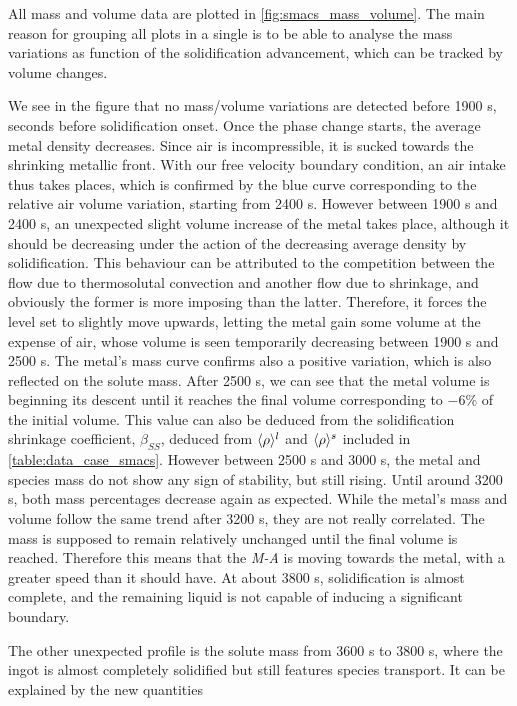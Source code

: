 All mass and volume data are plotted in \cref{fig:smacs_mass_volume}. The main reason for grouping all plots in a single
is to be able to analyse the mass variations as function of the solidification advancement, which can be tracked
by volume changes.

We see in the figure that no mass/volume variations are detected before 1900 s, seconds before solidification onset. Once the phase change starts, the average metal density decreases. Since air is incompressible, it is sucked towards the shrinking metallic front.
With our free velocity boundary condition, an air intake thus takes places, which is confirmed by the blue curve corresponding to the relative air volume variation, starting from 2400 s. However between 1900 s and 2400 s, an unexpected slight volume increase of the metal takes place, although it should be decreasing under the action of the decreasing average density by solidification. This behaviour can be attributed to the competition between the flow due to thermosolutal convection and another flow due to shrinkage, and obviously the former is more  imposing than the latter. Therefore, it forces the level set to slightly move upwards, letting the metal gain some volume at the expense of air, whose volume is seen temporarily decreasing between 1900 s and 2500 s.
The metal's mass curve confirms also a positive variation, which is also reflected on the solute mass.
After 2500 s, we can see that the metal volume is beginning its descent until it reaches the final volume corresponding to $-6\%$ of the initial volume. This value can also be deduced from the solidification shrinkage coefficient, $\beta_{SS}$, deduced from $\langle \rho \rangle^l$ and $\langle \rho \rangle^s$ included in \cref{table:data_case_smacs}.
However between 2500 s and 3000 s, the metal and species mass do not show any sign of stability, but still rising. Until around 3200 s, both mass percentages decrease again as expected.
While the metal's mass and volume follow the same trend after 3200 s, they are not really correlated. The mass is supposed to remain relatively unchanged until the final volume is reached. Therefore this means that the \emph{M-A} is moving towards the metal, with a greater speed than it should have. At about 3800 s, solidification is almost complete, and the remaining liquid is not capable of inducing a significant boundary. 

The other unexpected profile is the solute mass from 3600 s to 3800 s, where the ingot is almost completely solidified but still features species transport.
It can be explained by the new quantities 

